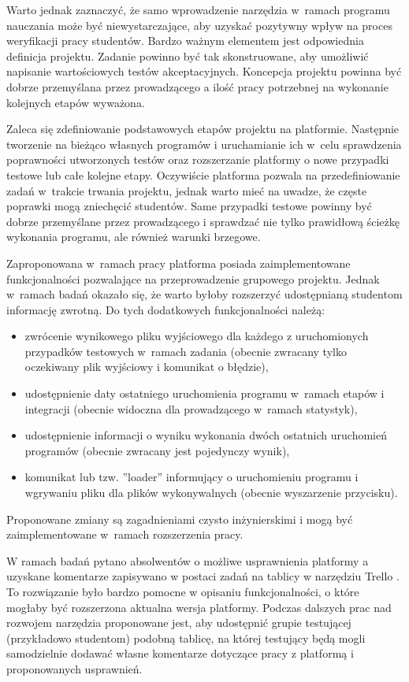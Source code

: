 Warto jednak zaznaczyć, że samo wprowadzenie narzędzia w~ramach programu nauczania może być niewystarczające, aby uzyskać pozytywny wpływ na proces weryfikacji pracy studentów.
Bardzo ważnym elementem jest odpowiednia definicja projektu.
Zadanie powinno być tak skonstruowane, aby umożliwić napisanie wartościowych testów akceptacyjnych.
Koncepcja projektu powinna być dobrze przemyślana przez prowadzącego a ilość pracy potrzebnej na wykonanie kolejnych etapów wyważona.

Zaleca się zdefiniowanie podstawowych etapów projektu na platformie.
Następnie tworzenie na bieżąco własnych programów i uruchamianie ich w~celu sprawdzenia poprawności utworzonych testów oraz rozszerzanie platformy o nowe przypadki testowe lub całe kolejne etapy.
Oczywiście platforma pozwala na przedefiniowanie zadań w~trakcie trwania projektu, jednak warto mieć na uwadze, że częste poprawki mogą zniechęcić studentów.
Same przypadki testowe powinny być dobrze przemyślane przez prowadzącego i sprawdzać nie tylko prawidłową ścieżkę wykonania programu, ale również warunki brzegowe.

Zaproponowana w~ramach pracy platforma posiada zaimplementowane funkcjonalności pozwalające na przeprowadzenie grupowego projektu.
Jednak w~ramach badań okazało się, że warto byłoby rozszerzyć udostępnianą studentom informację zwrotną.
Do tych dodatkowych funkcjonalności należą:
\begin{itemize}
    \item zwrócenie wynikowego pliku wyjściowego dla każdego z uruchomionych przypadków testowych w~ramach zadania (obecnie zwracany tylko oczekiwany plik wyjściowy i komunikat o błędzie),
    \item udostępnienie daty ostatniego uruchomienia programu w~ramach etapów i integracji (obecnie widoczna dla prowadzącego w~ramach statystyk),
    \item udostępnienie informacji o wyniku wykonania dwóch ostatnich uruchomień programów (obecnie zwracany jest pojedynczy wynik),
    \item komunikat lub tzw. ”loader” informujący o uruchomieniu programu i wgrywaniu pliku dla plików wykonywalnych (obecnie wyszarzenie przycisku).
\end{itemize}
Proponowane zmiany są zagadnieniami czysto inżynierskimi i mogą być zaimplementowane w~ramach rozszerzenia pracy.

W ramach badań pytano absolwentów o możliwe usprawnienia platformy a uzyskane komentarze zapisywano w postaci zadań na tablicy w narzędziu Trello \cite{trello}.
To rozwiązanie było bardzo pomocne w opisaniu funkcjonalności, o które mogłaby być rozszerzona aktualna wersja  platformy.
Podczas dalszych prac nad rozwojem narzędzia proponowane jest, aby udostępnić grupie testującej (przykładowo studentom) podobną tablicę, na której testujący będą mogli samodzielnie dodawać własne komentarze dotyczące pracy z platformą i proponowanych usprawnień.

